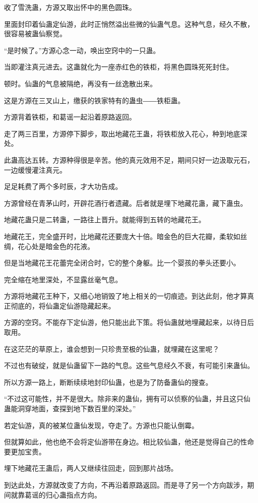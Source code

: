 \begin{this_body}
收了雪洗蛊，方源又取出怀中的黑色圆珠。

里面封印着仙蛊定仙游，此时正悄然溢出些微的仙蛊气息。这种气息，经久不散，很容易被蛊仙察觉。

“是时候了。”方源心念一动，唤出空窍中的一只蛊。

当即灌注真元进去。这蛊就化为一座赤红色的铁柜，将黑色圆珠死死封住。

顿时。仙蛊的气息被隔绝，再没有一丝逸散出来。

这是方源在三叉山上，缴获的铁家特有的蛊虫――铁柜蛊。

方源背着铁柜，和葛谣一起沿着原路返回。

走了两三百里，方源停下脚步，取出地藏花王蛊，将铁柜放入花心，种到地底深处。

此蛊高达五转。方源种得很是辛苦。他的真元效用不足，期间只好一边汲取元石，一边缓慢灌注真元。

足足耗费了两个多时辰，才大功告成。

方源曾经在青茅山时，开辟花酒行者遗藏。后者就是埋下地藏花蛊，藏下蛊虫。

地藏花蛊只是二转蛊，一路往上晋升。就能得到五转的地藏花王。

地藏花王，完全盛开时，比地藏花还要庞大十倍。暗金色的巨大花瓣，柔软如丝绸，花心处是暗金色的花液。

但是当地藏花王花蕾完全闭合时，它的整个身躯。比一个婴孩的拳头还要小。

完全缩在地里深处，不显露丝毫气息。

方源将地藏花王种下，又细心地销毁了地上相关的一切痕迹。到达此刻，他才算真正彻底的，将仙蛊定仙游隐藏起来。

方源的空窍。不能存下定仙游，他只能出此下策。将仙蛊就地埋藏起来，以待日后取用。

在这茫茫的草原上，谁会想到一只珍贵至极的仙蛊，就埋藏在这里呢？

不过也有破绽，就是仙蛊留下一路的气息。这些气息经久不衰，有可能引来蛊仙。

所以方源一路上，断断续续地封印仙蛊，也是为了防备蛊仙的搜查。

“不过这可能性，并不是很大。除非来的蛊仙，拥有可以侦察的仙蛊，并且这只仙蛊能洞穿地面，查探到地下数百里的深处。”

若定仙游，真的被某位蛊仙发现，夺走了。方源也只能认倒霉。

但就算如此，他也绝不会将定仙游带在身边。相比较仙蛊，他还是觉得自己的性命要更加宝贵。

埋下地藏花王蛊后，两人又继续往回走，回到那片战场。

到达此处，方源就改变了方向，不再沿着原路返回。而是寻了另一个方向跋涉，期间就靠葛谣的归心蛊指点方向。


\end{this_body}
